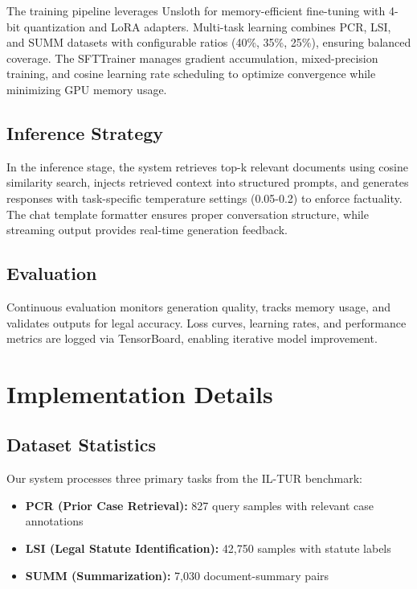 \documentclass[11pt]{article}
\begin{document}
The training pipeline leverages Unsloth for memory-efficient fine-tuning with 4-bit quantization and LoRA adapters. Multi-task learning combines PCR, LSI, and SUMM datasets with configurable ratios (40\%, 35\%, 25\%), ensuring balanced coverage. The SFTTrainer manages gradient accumulation, mixed-precision training, and cosine learning rate scheduling to optimize convergence while minimizing GPU memory usage.

\subsection{Inference Strategy}

In the inference stage, the system retrieves top-k relevant documents using cosine similarity search, injects retrieved context into structured prompts, and generates responses with task-specific temperature settings (0.05-0.2) to enforce factuality. The chat template formatter ensures proper conversation structure, while streaming output provides real-time generation feedback.

\subsection{Evaluation}

Continuous evaluation monitors generation quality, tracks memory usage, and validates outputs for legal accuracy. Loss curves, learning rates, and performance metrics are logged via TensorBoard, enabling iterative model improvement.

\section{Implementation Details}

\subsection{Dataset Statistics}

Our system processes three primary tasks from the IL-TUR benchmark:
\begin{itemize}
\item \textbf{PCR (Prior Case Retrieval):} 827 query samples with relevant case annotations
\item \textbf{LSI (Legal Statute Identification):} 42,750 samples with statute labels
\item \textbf{SUMM (Summarization):} 7,030 document-summary pairs
\end{itemize}
\end{document}
